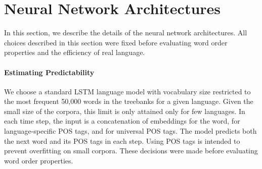 \documentclass[10pt,twoside,lineno]{article}
\begin{document}







\section{Neural Network Architectures}\label{sec:neural-architectures}

In this section, we describe the details of the neural network architectures.
All choices described in this section were fixed before evaluating word order properties and the efficiency of real language.


\paragraph{Estimating Predictability}
We choose a standard LSTM \citep{hochreiter1997long} language model with vocabulary size restricted to the most frequent 50,000 words in the treebanks for a given language.
Given the small size of the corpora, this limit is only attained only for few languages.
In each time step, the input is a concatenation of embeddings for the word, for language-specific POS tags, and for universal POS tags.
The model predicts both the next word and its POS tags in each step.
Using POS tags is intended to prevent overfitting on small corpora.
These decisions were made before evaluating word order properties.
\end{document}
